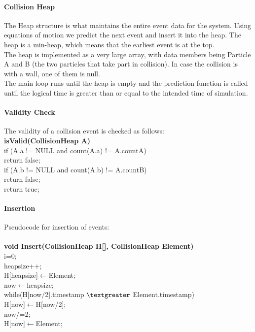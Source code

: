 \documentclass[12pt]{article}
\begin{document}
\paragraph{Collision Heap}
The Heap structure is what maintains the entire event data for the system. Using equations of motion we predict the next event and insert it into the heap. The heap is a min-heap, which means that the earliest event is at the top.\\
The heap is implemented as a very large array, with data members being Particle A and B (the two particles that take part in collision). In case the collision is with a wall, one of them is null. \\
The main loop runs until the heap is empty and the prediction function is called until the logical time is greater than or equal to the intended time of simulation.\\

\paragraph{Validity Check}
The validity of a collision event is checked as follows:\\


			\textbf{isValid(CollisionHeap A)} \\
			\indent \indent if (A.a != NULL and count(A.a) != A.countA)\\ 
			\indent \indent \indent return false;\\
			\indent \indent if (A.b != NULL and count(A.b) != A.countB)\\ 
			\indent \indent \indent return false;\\
			\indent \indent return true;\\
		




\paragraph{Insertion}
Pseudocode for insertion of events: \\ \\
\textbf{void Insert(CollisionHeap H[], CollisionHeap Element)}\\

	\indent \indent i=0;\\
	\indent \indent heapsize++;\\
	\indent \indent H[heapsize]$\leftarrow$Element;\\
   \indent \indent now$\leftarrow$heapsize;\\
   \indent \indent while(H[now/2].timestamp $\textgreater$ Element.timestamp)\\
   \indent \indent\indent H[now]$\leftarrow$H[now/2];\\
   \indent \indent\indent now/=2;\\
   \indent \indent H[now]$\leftarrow$Element;\\
\\
\end{document}
